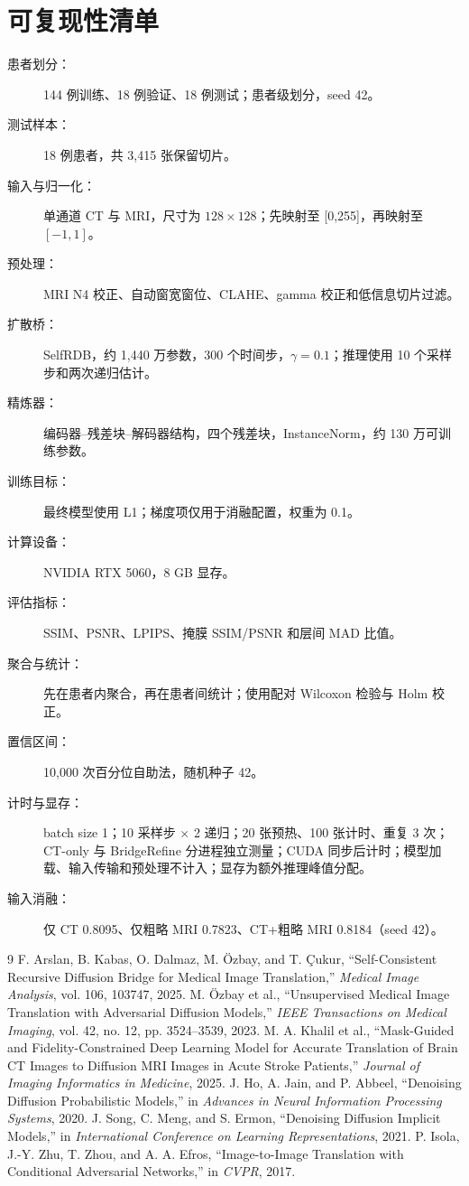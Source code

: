 \documentclass[UTF8,12pt,a4paper,twocolumn]{ctexart}
\begin{document}
\section{可复现性清单}
\begin{description}
\item[患者划分：]144 例训练、18 例验证、18 例测试；患者级划分，seed 42。
\item[测试样本：]18 例患者，共 3,415 张保留切片。
\item[输入与归一化：]单通道 CT 与 MRI，尺寸为 $128\times128$；先映射至 [0,255]，再映射至 $[-1,1]$。
\item[预处理：]MRI N4 校正、自动窗宽窗位、CLAHE、gamma 校正和低信息切片过滤。
\item[扩散桥：]SelfRDB，约 1,440 万参数，300 个时间步，$\gamma=0.1$；推理使用 10 个采样步和两次递归估计。
\item[精炼器：]编码器--残差块--解码器结构，四个残差块，InstanceNorm，约 130 万可训练参数。
\item[训练目标：]最终模型使用 L1；梯度项仅用于消融配置，权重为 0.1。
\item[计算设备：]NVIDIA RTX 5060，8 GB 显存。
\item[评估指标：]SSIM、PSNR、LPIPS、掩膜 SSIM/PSNR 和层间 MAD 比值。
\item[聚合与统计：]先在患者内聚合，再在患者间统计；使用配对 Wilcoxon 检验与 Holm 校正。
\item[置信区间：]10,000 次百分位自助法，随机种子 42。
\item[计时与显存：]batch size 1；10 采样步 × 2 递归；20 张预热、100 张计时、重复 3 次；CT-only 与 BridgeRefine 分进程独立测量；CUDA 同步后计时；模型加载、输入传输和预处理不计入；显存为额外推理峰值分配。
\item[输入消融：]仅 CT 0.8095、仅粗略 MRI 0.7823、CT+粗略 MRI 0.8184（seed 42）。
\end{description}

\begin{thebibliography}{9}
 F. Arslan, B. Kabas, O. Dalmaz, M. Özbay, and T. Çukur, ``Self-Consistent Recursive Diffusion Bridge for Medical Image Translation,'' \textit{Medical Image Analysis}, vol. 106, 103747, 2025.
 M. Özbay et al., ``Unsupervised Medical Image Translation with Adversarial Diffusion Models,'' \textit{IEEE Transactions on Medical Imaging}, vol. 42, no. 12, pp. 3524--3539, 2023.
 M. A. Khalil et al., ``Mask-Guided and Fidelity-Constrained Deep Learning Model for Accurate Translation of Brain CT Images to Diffusion MRI Images in Acute Stroke Patients,'' \textit{Journal of Imaging Informatics in Medicine}, 2025.
 J. Ho, A. Jain, and P. Abbeel, ``Denoising Diffusion Probabilistic Models,'' in \textit{Advances in Neural Information Processing Systems}, 2020.
 J. Song, C. Meng, and S. Ermon, ``Denoising Diffusion Implicit Models,'' in \textit{International Conference on Learning Representations}, 2021.
 P. Isola, J.-Y. Zhu, T. Zhou, and A. A. Efros, ``Image-to-Image Translation with Conditional Adversarial Networks,'' in \textit{CVPR}, 2017.
\end{thebibliography}
\end{document}
